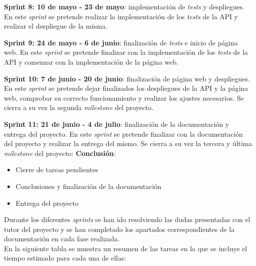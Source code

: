 \textbf{Sprint 8: 10 de mayo - 23 de mayo}: implementación de \textit{tests} y despliegues. En este \textit{sprint}
se pretende realizar la implementación de los \textit{tests} de la API y realizar el despliegue de la misma.

\textbf{Sprint 9: 24 de mayo - 6 de junio}: finalización de \textit{tests} e inicio de página web. En este \textit{sprint}
se pretende finalizar con la implementación de los \textit{tests} de la API y comenzar con la implementación de la página web.

\textbf{Sprint 10: 7 de junio - 20 de junio}: finalización de página web y despliegues. En este \textit{sprint} se pretende
dejar finalizados los despliegues de la API y la página web, comprobar su correcto funcionamiento y realizar los ajustes
necesarios. Se cierra a su vez la segunda \textit{milestone} del proyecto.

\textbf{Sprint 11: 21 de junio - 4 de julio}: finalización de la documentación y entrega del proyecto. En este \textit{sprint} se
pretende finalizar con la documentación del proyecto y realizar la entrega del mismo. Se cierra a su vez la tercera y
última \textit{milestone} del proyecto: \textbf{Conclusión}:

\begin{itemize}
    \item Cierre de tareas pendientes
    \item Conclusiones y finalización de la documentación
    \item Entrega del proyecto
\end{itemize}

\newpage

Durante los diferentes \textit{sprints} se han ido resolviendo las dudas presentadas con el tutor del proyecto
y se han completado los apartados correspondientes de la documentación en cada fase realizada. \\

En la siguiente tabla se muestra un resumen de las tareas en la
que se incluye el tiempo estimado para cada una de ellas:

